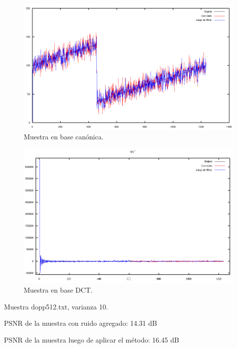 \documentclass[a4paper,10pt,twoside]{article}
\begin{document}
\begin{figure}[H]
  \centering
  \includegraphics[width=15cm]{graficos/ramp_aditivo_umbralizar_muestra.png}
  \caption{Muestra en base canónica.}
\end{figure}

\begin{figure}[H]
  \centering
  \includegraphics[width=15cm]{graficos/ramp_aditivo_umbralizar_dct.png} 
  \caption{Muestra en base DCT.}
\end{figure}


Muestra dopp512.txt, varianza 10.

PSNR de la muestra con ruido agregado: 14.31 dB

PSNR de la muestra luego de aplicar el método: 16.45 dB
\end{document}
